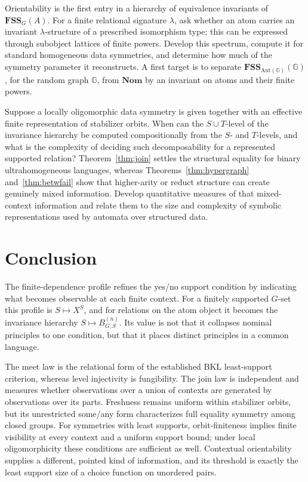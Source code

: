 \documentclass{lmcs}
\newcommand{\Aut}{\mathrm{Aut}}
\newcommand{\Nom}{\mathbf{Nom}}
\newcommand{\FSS}{\mathbf{FSS}}
\begin{document}
\begin{qu}\label{q:spectrum}
Orientability is the first entry in a hierarchy of equivalence
invariants of $\FSS_G(A)$. For a finite relational signature
$\lambda$, ask whether an atom carries an invariant
$\lambda$-structure of a prescribed isomorphism type; this can be
expressed through subobject lattices of finite powers. Develop this
spectrum, compute it for standard homogeneous data symmetries, and
determine how much of the symmetry parameter it reconstructs. A first
target is to separate
$\FSS_{\Aut(\mathbb G)}(\mathbb G)$, for the random graph
$\mathbb G$, from $\Nom$ by an invariant on atoms and their finite
powers.
\end{qu}

\begin{qu}\label{q:effectivejoin}
Suppose a locally oligomorphic data symmetry is given together with an
effective finite representation of stabilizer orbits. When can the
$S\cup T$-level of the invariance hierarchy be computed compositionally
from the $S$- and $T$-levels, and what is the complexity of deciding such
decomposability for a represented supported relation?  Theorem~\ref{thm:join}
settles the structural equality for binary ultrahomogeneous languages,
whereas Theorems~\ref{thm:hypergraph} and~\ref{thm:betwfail} show that
higher-arity or reduct structure can create genuinely mixed information.
Develop quantitative measures of that mixed-context information and relate
them to the size and complexity of symbolic representations used by
automata over structured data.
\end{qu}

\section{Conclusion}\label{sec:conclusion}

The finite-dependence profile refines the yes/no support condition by
indicating what becomes observable at each finite context. For a finitely supported $G$-set this profile is $S\mapsto X^S$, and for relations on the
atom object it becomes the invariance hierarchy
$S\mapsto B^{(n)}_{G,S}$. Its value is not that it collapses nominal
principles to one condition, but that it places distinct principles in a
common language.

The meet law is the relational form of the established BKL
least-support criterion, whereas level injectivity is
fungibility. The join law is independent and measures whether observations
over a union of contexts are generated by observations over its parts.
Freshness remains uniform within stabilizer orbits, but its unrestricted
some/any form characterizes full equality symmetry among closed groups. For
symmetries with least supports, orbit-finiteness implies finite visibility at
every context and a uniform support bound; under local oligomorphicity these
conditions are sufficient as well. Contextual orientability supplies a
different, pointed kind of information, and its threshold is exactly the
least support size of a choice function on unordered pairs.
\end{document}
